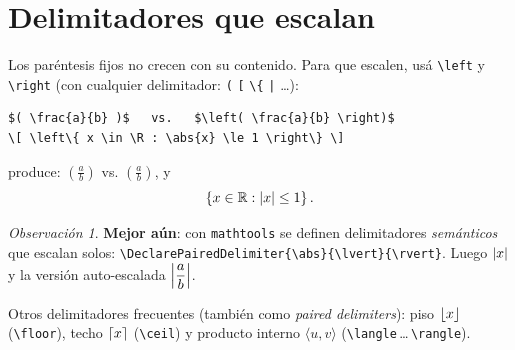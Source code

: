 \documentclass[11pt,a4paper]{article}
\newcommand{\C}[1]{\texttt{\textbackslash #1}}   %
\newcommand{\R}{\mathbb{R}}  \newcommand{\N}{\mathbb{N}}
\DeclarePairedDelimiter{\abs}{\lvert}{\rvert}
\DeclarePairedDelimiter{\floor}{\lfloor}{\rfloor}
\DeclarePairedDelimiter{\ceil}{\lceil}{\rceil}
\theoremstyle{plain}      %
\theoremstyle{definition} %
\theoremstyle{remark}
\newtheorem*{obs}{Observación}
\begin{document}
\section{Delimitadores que escalan}
Los paréntesis fijos no crecen con su contenido. Para que escalen, usá
\C{left} y \C{right} (con cualquier delimitador: \texttt{(} \texttt{[}
\verb|\{| \verb;|; \dots):
\begin{lstlisting}
$( \frac{a}{b} )$   vs.   $\left( \frac{a}{b} \right)$
\[ \left\{ x \in \R : \abs{x} \le 1 \right\} \]
\end{lstlisting}
produce: $( \frac{a}{b} )$ \;vs.\; $\left( \frac{a}{b} \right)$, y
\[ \left\{ x \in \R : \abs{x} \le 1 \right\}. \]

\begin{obs}
\textbf{Mejor aún}: con \texttt{mathtools} se definen delimitadores
\emph{semánticos} que escalan solos:
\verb|\DeclarePairedDelimiter{\abs}{\lvert}{\rvert}|. Luego $\abs{x}$ y la versión
auto-escalada $\abs*{\dfrac{a}{b}}$.
\end{obs}

Otros delimitadores frecuentes (también como \emph{paired delimiters}): piso
$\floor{x}$ (\C{floor}), techo $\ceil{x}$ (\C{ceil}) y producto interno
$\langle u,v\rangle$ (\C{langle}\,\dots\,\C{rangle}).

\end{document}
